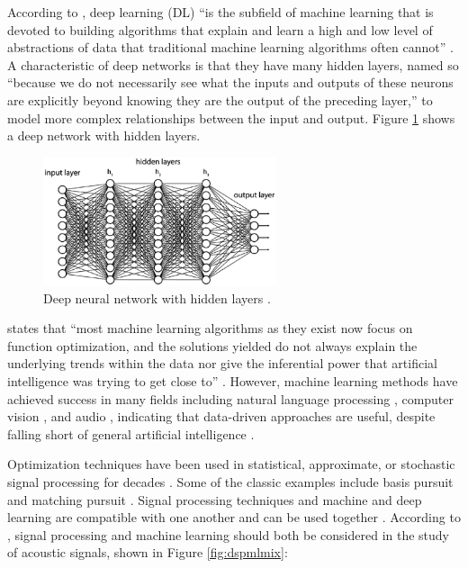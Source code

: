 \documentclass[report.tex]{subfiles}
\begin{document}
According to \citeauthor{introtodl}, deep learning (DL) ``is the subfield of machine learning that is devoted to building algorithms that explain and learn a high and low level of abstractions of data that traditional machine learning algorithms often cannot'' \parencite[1]{introtodl}. A characteristic of deep networks is that they have many hidden layers, named so ``because we do not necessarily see what the inputs and outputs of these neurons are explicitly beyond knowing they are the output of the preceding layer,'' \parencite[2]{introtodl} to model more complex relationships between the input and output. Figure \ref{fig:fcdn} shows a deep network with hidden layers.

\begin{figure}[ht]
	\centering
	\includegraphics[width=0.6094\textwidth]{./images-neural/dnn.png}
	\caption{Deep neural network with hidden layers \parencite[2]{introtodl}.}
	\label{fig:fcdn}
\end{figure}

\citeauthor{introtodl} states that ``most machine learning algorithms as they exist now focus on function optimization, and the solutions yielded do not always explain the underlying trends within the data nor give the inferential power that artificial intelligence was trying to get close to'' \parencite[1]{introtodl}. However, machine learning methods have achieved success in many fields including natural language processing \parencite{nlpml}, computer vision \parencite{cvml}, and audio \parencite{audiodeeplearning}, indicating that data-driven approaches are useful, despite falling short of general artificial intelligence \parencite{generalai}.

Optimization techniques have been used in statistical, approximate, or stochastic signal processing \parencite{stochasticsp, statisticalsp} for decades \parencite{optsp}. Some of the classic examples include basis pursuit and matching pursuit \parencite{dictionary1, dictionary2}. Signal processing techniques and machine and deep learning are compatible with one another and can be used together \parencite{mlsp1, mlsp2}. According to \citeauthor{mldspmix}, signal processing and machine learning should both be considered in the study of acoustic signals, shown in Figure \ref{fig:dspmlmix}:
\end{document}
